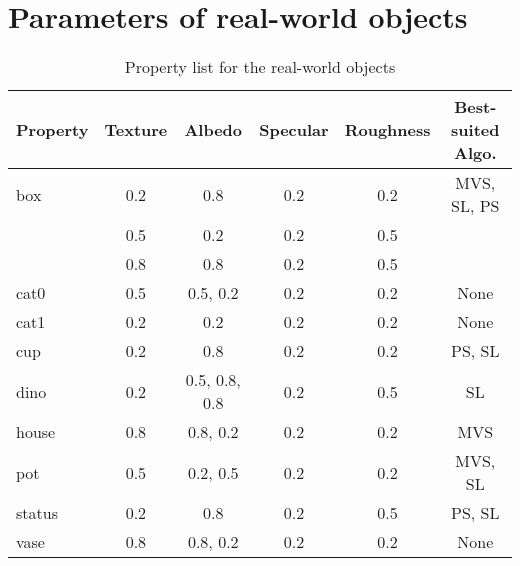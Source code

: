 \section{Parameters of real-world objects}
\begin{table}[!htbp]
  \centering
  \begin{tabular}{l*{5}{c}}
  \hline
  \textbf{Property} & Texture & Albedo & Specular & Roughness & Best-suited Algo.\\
  \hline
  box & 0.2 & 0.8 & 0.2 & 0.2 & MVS, SL, PS\\
      & 0.5 & 0.2 & 0.2 & 0.5 & \\
      & 0.8 & 0.8 & 0.2 & 0.5 & \\
  cat0 & 0.5 & 0.5, 0.2 & 0.2 & 0.2 & None\\
  cat1 & 0.2 & 0.2 & 0.2 & 0.2 & None\\
  cup & 0.2 & 0.8 & 0.2 & 0.2 & PS, SL\\
  dino & 0.2 & 0.5, 0.8, 0.8 & 0.2 & 0.5 & SL\\
  house & 0.8 & 0.8, 0.2 & 0.2 & 0.2 & MVS\\
  pot & 0.5 & 0.2, 0.5 & 0.2 & 0.2 & MVS, SL\\
  status & 0.2 & 0.8 & 0.2 & 0.5 & PS, SL\\
  vase & 0.8 & 0.8, 0.2 & 0.2 & 0.2 & None\\
  \hline
  \end{tabular}
  \caption{Property list for the real-world objects}
  \label{tab:real_data_prop_list}
\end{table}

